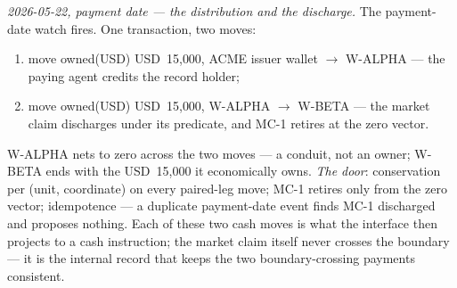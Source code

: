 \documentclass[11pt,a4paper]{article}
\newcommand{\USD}[1]{\mbox{USD~#1}}
\begin{document}
\emph{2026-05-22, payment date --- the distribution and the discharge.} The
payment-date watch fires. One transaction, two moves:
\begin{enumerate}[label=(\arabic*),nosep]
\item move owned(USD) \USD{15{,}000}, ACME issuer wallet $\to$ W-ALPHA --- the paying
agent credits the record holder;
\item move owned(USD) \USD{15{,}000}, W-ALPHA $\to$ W-BETA --- the market claim
discharges under its predicate, and MC-1 retires at the zero vector.
\end{enumerate}
W-ALPHA nets to zero across the two moves --- a conduit, not an owner; W-BETA ends
with the \USD{15{,}000} it economically owns. \emph{The door}: conservation per
(unit, coordinate) on every paired-leg move; MC-1 retires only from the zero vector;
idempotence --- a duplicate payment-date event finds MC-1 discharged and proposes
nothing. Each of these two cash moves is what the interface then projects to a cash
instruction; the market claim itself never crosses the boundary --- it is the
internal record that keeps the two boundary-crossing payments consistent.
\end{document}

